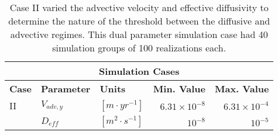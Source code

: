 \begin{table}[ht!]
\centering
\footnotesize{
\begin{tabular}{|l|l|l|r|r|}
\multicolumn{5}{c}{\textbf{Simulation Cases}}\\
\hline
\textbf{Case} & \textbf{Parameter} & \textbf{Units} & \textbf{Min. Value} & \textbf{Max. Value}\\
\hline
II    & $V_{adv, y}$ & $[m \cdot yr^{-1}]$       & $6.31\times10^{-8}$  &  $6.31\times10^{-4}$ \\
      & $D_{eff}$    & $[m^2\cdot s^{-1}]$       & $10^{-8}$    &  $10^{-5}$ \\
\hline
\end{tabular}
\caption{Case II varied the advective velocity and effective diffusivity to 
  determine the nature of the threshold between the diffusive and advective 
  regimes. This dual parameter simulation case had 40 simulation 
groups of 100 realizations each.}
\label{tab:Cases}
}
\end{table}

